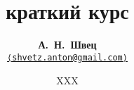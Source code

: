 \documentclass{\jobname}
\title{\Huge\hologo{METAPOST}\\\Large краткий курс}
\author{\textbf{А.~Н.~Швец}\\{\small\href{mailto:shvetz.anton@gmail.com}{\nolinkurl{⟨shvetz.anton@gmail.com⟩}}}}
\date{XXX}
\begin{document}
\begin{frame}{}
\leavevmode
\begin{columns}

\titlepage
\end{columns}
\end{frame}



















\end{document}
